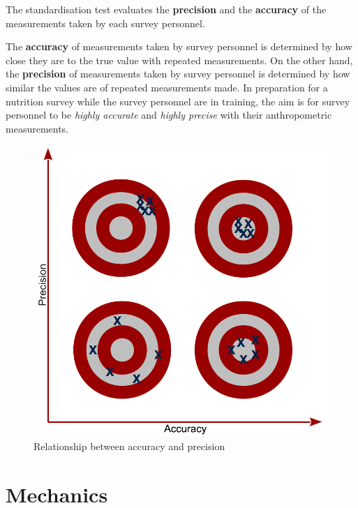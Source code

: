 \documentclass[12pt,a4paper]{book}
\theoremstyle{definition}
\theoremstyle{definition}
\theoremstyle{definition}
\theoremstyle{remark}
\begin{document}
The standardisation test evaluates the \textbf{precision} and the
\textbf{accuracy} of the measurements taken by each survey personnel.

The \textbf{accuracy} of measurements taken by survey personnel is
determined by how close they are to the true value with repeated
measurements. On the other hand, the \textbf{precision} of measurements
taken by survey personnel is determined by how similar the values are of
repeated measurements made. In preparation for a nutrition survey while
the survey personnel are in training, the aim is for survey personnel to
be \emph{highly accurate} and \emph{highly precise} with their
anthropometric measurements.

\begin{figure}

{\centering \includegraphics[width=11.11in]{figures/accuracyPrecision} 

}

\caption{Relationship between accuracy and precision}\label{fig:standard01}
\end{figure}

\hypertarget{mechanics}{%
\section{Mechanics}\label{mechanics}}
\end{document}
